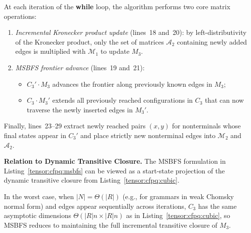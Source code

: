 At each iteration of the \textbf{while} loop, the algorithm performs two core matrix operations:
\begin{enumerate}
    \item \emph{Incremental Kronecker product update} (lines~18 and~20): by left-distributivity of the Kronecker product, only the set of matrices $\mathcal{A}_2$ containing newly added edges is multiplied with $\mathcal{M}_1$ to update $M_3$.
    \item \emph{MSBFS frontier advance} (lines~19 and~21):
    \begin{itemize}
        \item $C_3' \cdot M_3$ advances the frontier along previously known edges in $M_3$;
        \item $C_3 \cdot M_3'$ extends all previously reached configurations in $C_3$ that can now traverse the newly inserted edges in $M_3'$.
    \end{itemize}
\end{enumerate}
Finally, lines~23--29 extract newly reached pairs $(x, y)$ for nonterminals whose final states appear in $C_3'$ and place strictly new nonterminal edges into $\mathcal{M}_2$ and $\mathcal{A}_2$.

\textbf{Relation to Dynamic Transitive Closure.}
The MSBFS formulation in Listing~\ref{tensor:cfpq:msbfs} can be viewed as a start-state projection of the dynamic transitive closure from Listing~\ref{tensor:cfpq:cubic}.

In the worst case, when $|N| = \Theta(|R|)$ (e.g., for grammars in weak Chomsky normal form) and edges appear sequentially across iterations, $C_3$ has the same asymptotic dimensions $\Theta(|R|n \times |R|n)$ as in Listing~\ref{tensor:cfpq:cubic}, so MSBFS reduces to maintaining the full incremental transitive closure of $M_3$.

